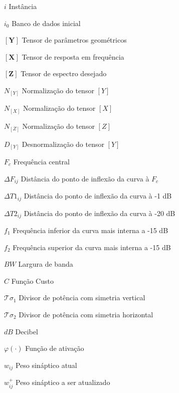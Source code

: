 

\begin{simbolos}
\item[$ i $] Instância
\item[$ i_{0} $] Banco de dados inicial
\item[$ \mathbf{[Y]} $] Tensor de parâmetros geométricos
\item[$ \mathbf{[X]} $] Tensor de resposta em frequência
\item[$ \mathbf{[Z]} $] Tensor de espectro desejado
\item[$N_{[Y]}$] Normalização do tensor $[Y]$
\item[$N_{[X]}$] Normalização do tensor $[X]$
\item[$N_{[Z]}$] Normalização do tensor $[Z]$
\item[$D_{[Y]}$] Desnormalização do tensor $[Y]$
\item[$F_{c}$] Frequência central
\item[$\Delta F_{ij}$] Distância do ponto de inflexão da curva à $F_{c}$
\item[$\Delta T1_{ij}$] Distância do ponto de inflexão da curva à -1 dB
\item[$\Delta T2_{ij}$] Distância do ponto de inflexão da curva à -20 dB
\item[$f_{1}$] Frequência inferior da curva mais interna a -15 dB
\item[$f_{2}$] Frequência superior da curva mais interna a -15 dB
\item[$BW$] Largura de banda 
\item[$ C $] Função Custo
\item[$ \mathcal{T}\sigma_{1} $] Divisor de potência com simetria vertical
\item[$ \mathcal{T}\sigma_{2} $] Divisor de potência com simetria horizontal 
\item[$ dB $] Decibel
\item[$ \varphi(\cdot) $] Função de ativação
\item[$ w_{ij} $] Peso sináptico atual 
\item[$ w_{ij}^{+} $] Peso sináptico a ser atualizado
\end{simbolos}
